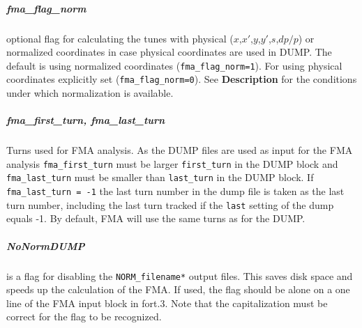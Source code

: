 \subparagraph{fma\_flag\_norm}
optional flag for calculating the tunes with physical ($x$,$x'$,$y$,$y'$,$s$,$dp/p$) or normalized coordinates in case physical coordinates are used in DUMP. The default is using normalized coordinates (\verb|fma_flag_norm=1|). For using physical coordinates explicitly set (\verb|fma_flag_norm=0|). See \textbf{Description} for the conditions under which normalization is available.

\subparagraph{fma\_first\_turn, fma\_last\_turn}
Turns used for FMA analysis. As the DUMP files are used as input for the FMA analysis \texttt{fma\_first\_turn} must be larger \texttt{first\_turn} in the DUMP block and  \texttt{fma\_last\_turn} must be smaller than \texttt{last\_turn} in the DUMP block. If \texttt{fma\_last\_turn = -1} the last turn number in the dump file is taken as the last turn number, including the last turn tracked if the \texttt{last} setting of the dump equals -1.
By default, FMA will use the same turns as for the DUMP.

\subparagraph{NoNormDUMP} is a flag for disabling the \texttt{NORM\_filename*} output files.
This saves disk space and speeds up the calculation of the FMA.
If used, the flag should be alone on a one line of the FMA input block in fort.3.
Note that the capitalization must be correct for the flag to be recognized.


